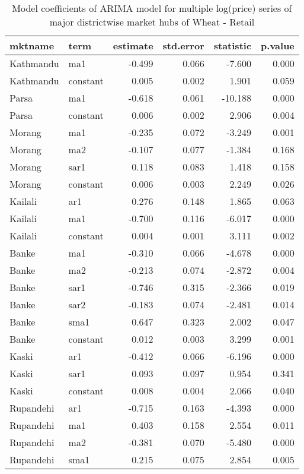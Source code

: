 \documentclass[
  12pt,
]{article}
\begin{document}
\begin{table}

\caption{\label{tab:multiple-arima-summary}Model coefficients of ARIMA model for multiple log(price) series of major districtwise market hubs of Wheat - Retail}
\centering
\begin{tabular}[t]{llrrrr}
\toprule
mktname & term & estimate & std.error & statistic & p.value\\
\midrule
Kathmandu & ma1 & -0.499 & 0.066 & -7.600 & 0.000\\
Kathmandu & constant & 0.005 & 0.002 & 1.901 & 0.059\\
Parsa & ma1 & -0.618 & 0.061 & -10.188 & 0.000\\
Parsa & constant & 0.006 & 0.002 & 2.906 & 0.004\\
Morang & ma1 & -0.235 & 0.072 & -3.249 & 0.001\\
\addlinespace
Morang & ma2 & -0.107 & 0.077 & -1.384 & 0.168\\
Morang & sar1 & 0.118 & 0.083 & 1.418 & 0.158\\
Morang & constant & 0.006 & 0.003 & 2.249 & 0.026\\
Kailali & ar1 & 0.276 & 0.148 & 1.865 & 0.063\\
Kailali & ma1 & -0.700 & 0.116 & -6.017 & 0.000\\
\addlinespace
Kailali & constant & 0.004 & 0.001 & 3.111 & 0.002\\
Banke & ma1 & -0.310 & 0.066 & -4.678 & 0.000\\
Banke & ma2 & -0.213 & 0.074 & -2.872 & 0.004\\
Banke & sar1 & -0.746 & 0.315 & -2.366 & 0.019\\
Banke & sar2 & -0.183 & 0.074 & -2.481 & 0.014\\
\addlinespace
Banke & sma1 & 0.647 & 0.323 & 2.002 & 0.047\\
Banke & constant & 0.012 & 0.003 & 3.299 & 0.001\\
Kaski & ar1 & -0.412 & 0.066 & -6.196 & 0.000\\
Kaski & sar1 & 0.093 & 0.097 & 0.954 & 0.341\\
Kaski & constant & 0.008 & 0.004 & 2.066 & 0.040\\
\addlinespace
Rupandehi & ar1 & -0.715 & 0.163 & -4.393 & 0.000\\
Rupandehi & ma1 & 0.403 & 0.158 & 2.554 & 0.011\\
Rupandehi & ma2 & -0.381 & 0.070 & -5.480 & 0.000\\
Rupandehi & sma1 & 0.215 & 0.075 & 2.854 & 0.005\\
\bottomrule
\end{tabular}
\end{table}
\end{document}
